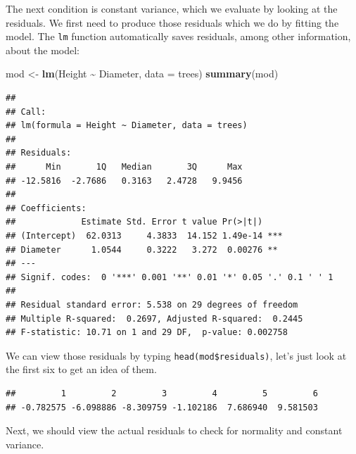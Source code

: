 \documentclass[
]{book}
\newenvironment{Shaded}{\begin{snugshade}}{\end{snugshade}}
\newcommand{\DataTypeTok}[1]{\textcolor[rgb]{0.13,0.29,0.53}{#1}}
\newcommand{\KeywordTok}[1]{\textcolor[rgb]{0.13,0.29,0.53}{\textbf{#1}}}
\newcommand{\NormalTok}[1]{#1}
\newcommand{\OperatorTok}[1]{\textcolor[rgb]{0.81,0.36,0.00}{\textbf{#1}}}
\newcommand{\StringTok}[1]{\textcolor[rgb]{0.31,0.60,0.02}{#1}}
\begin{document}
The next condition is constant variance, which we evaluate by looking at the residuals. We first need to produce those residuals which we do by fitting the model. The \texttt{lm} function automatically saves residuals, among other information, about the model:

\begin{Shaded}
\begin{Highlighting}[]
\NormalTok{mod \textless{}{-}}\StringTok{ }\KeywordTok{lm}\NormalTok{(Height }\OperatorTok{\textasciitilde{}}\StringTok{ }\NormalTok{Diameter, }\DataTypeTok{data =}\NormalTok{ trees)}
\KeywordTok{summary}\NormalTok{(mod)}
\end{Highlighting}
\end{Shaded}

\begin{verbatim}
## 
## Call:
## lm(formula = Height ~ Diameter, data = trees)
## 
## Residuals:
##      Min       1Q   Median       3Q      Max 
## -12.5816  -2.7686   0.3163   2.4728   9.9456 
## 
## Coefficients:
##             Estimate Std. Error t value Pr(>|t|)    
## (Intercept)  62.0313     4.3833  14.152 1.49e-14 ***
## Diameter      1.0544     0.3222   3.272  0.00276 ** 
## ---
## Signif. codes:  0 '***' 0.001 '**' 0.01 '*' 0.05 '.' 0.1 ' ' 1
## 
## Residual standard error: 5.538 on 29 degrees of freedom
## Multiple R-squared:  0.2697, Adjusted R-squared:  0.2445 
## F-statistic: 10.71 on 1 and 29 DF,  p-value: 0.002758
\end{verbatim}

We can view those residuals by typing \texttt{head(mod\$residuals)}, let's just look at the first six to get an idea of them.

\begin{Shaded}
\end{Shaded}

\begin{verbatim}
##         1         2         3         4         5         6 
## -0.782575 -6.098886 -8.309759 -1.102186  7.686940  9.581503
\end{verbatim}

Next, we should view the actual residuals to check for normality and constant variance.
\end{document}
